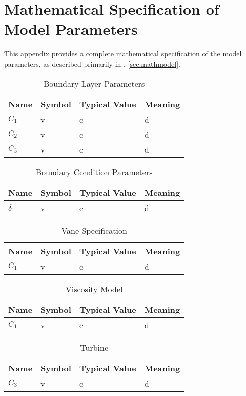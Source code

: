 \section{Mathematical Specification of Model Parameters}
\label{app:model_param}

This appendix provides a complete mathematical specification of the
model parameters, as described primarily in \label{sec:mathmodel}.
\ref{sec:mathmodel}.


%
%
%
\begin{table}[]
\centering
\caption{Boundary Layer Parameters}
\begin{tabular}{|l|l|l|l|}
\hline
Name & Symbol & Typical Value & Meaning \\
\hline
$C_1$     &   v     &      c         &    d     \\
$C_2$     &   v     &      c         &    d     \\
$C_3$     &   v     &      c         &    d     \\
\hline
\end{tabular}
\label{my-label}
\end{table}


%
%
%

\begin{table}[]
\centering
\caption{Boundary Condition Parameters}
\begin{tabular}{|l|l|l|l|}
\hline
Name & Symbol & Typical Value & Meaning \\
\hline
$\delta$     &   v     &      c         &    d     \\
\hline
\end{tabular}
\label{my-label}
\end{table}

%
%
%
\begin{table}[]
\centering
\caption{Vane Specification}
\begin{tabular}{|l|l|l|l|}
\hline
Name & Symbol & Typical Value & Meaning \\
\hline
$C_1$     &   v     &      c         &    d     \\
\hline
\end{tabular}
\label{my-label}
\end{table}

%
%
%
\begin{table}[]
\centering
\caption{Viscosity Model}
\begin{tabular}{|l|l|l|l|}
\hline
Name & Symbol & Typical Value & Meaning \\
\hline
$C_1$     &   v     &      c         &    d     \\
\hline
\end{tabular}
\label{my-label}
\end{table}


%
%
\begin{table}[]
\centering
\caption{Turbine}
\begin{tabular}{|l|l|l|l|}
\hline
Name & Symbol & Typical Value & Meaning \\
\hline
$C_3$     &   v     &      c         &    d     \\
\hline
\end{tabular}
\label{my-label}
\end{table}
